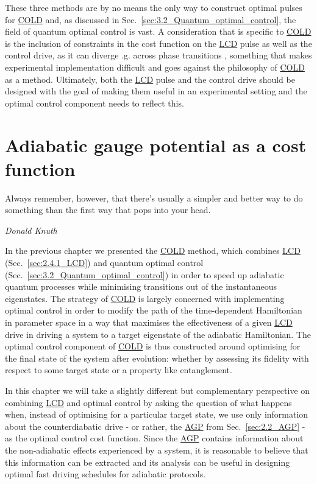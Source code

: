 \documentclass[a4paper,oneside,11pt]{book}
\newcommand{\acrref}[1]{\hyperref[acr:#1]{#1}}
\begin{document}
These three methods are by no means the only way to construct optimal pulses for \acrref{COLD} and, as discussed in Sec.~\ref{sec:3.2_Quantum_optimal_control}, the field of quantum optimal control is vast. A consideration that is specific to \acrref{COLD} is the inclusion of constraints in the cost function on the \acrref{LCD} pulse as well as the control drive, as it can diverge \@e.g. across phase transitions \cite{hatomura_controlling_2021}, something that makes experimental implementation difficult and goes against the philosophy of \acrref{COLD} as a method. Ultimately, both the \acrref{LCD} pulse and the control drive should be designed with the goal of making them useful in an experimental setting and the optimal control component needs to reflect this. 
\chapter{Adiabatic gauge potential as a cost function}\label{chap:5_cd_as_costfunc}

\epigraph{Always remember, however, that there’s usually a simpler and better way to do something than the first way that pops into your head.}{\emph{Donald Knuth}}

In the previous chapter we presented the \acrref{COLD} method, which combines \acrref{LCD} (Sec.~\ref{sec:2.4.1_LCD}) and quantum optimal control (Sec.~\ref{sec:3.2_Quantum_optimal_control}) in order to speed up adiabatic quantum processes while minimising transitions out of the instantaneous eigenstates. The strategy of \acrref{COLD} is largely concerned with implementing optimal control in order to modify the path of the time-dependent Hamiltonian in parameter space in a way that maximises the effectiveness of a given \acrref{LCD} drive in driving a system to a target eigenstate of the adiabatic Hamiltonian. The optimal control component of \acrref{COLD} is thus constructed around optimising for the final state of the system after evolution: whether by assessing its fidelity with respect to some target state or a property like entanglement.

In this chapter we will take a slightly different but complementary perspective on combining \acrref{LCD} and optimal control by asking the question of what happens when, instead of optimising for a particular target state, we use only information about the counterdiabatic drive - or rather, the \acrref{AGP} from Sec.~\ref{sec:2.2_AGP} - as the optimal control cost function. Since the \acrref{AGP} contains information about the non-adiabatic effects experienced by a system, it is reasonable to believe that this information can be extracted and its analysis can be useful in designing optimal fast driving schedules for adiabatic protocols. 
\end{document}
